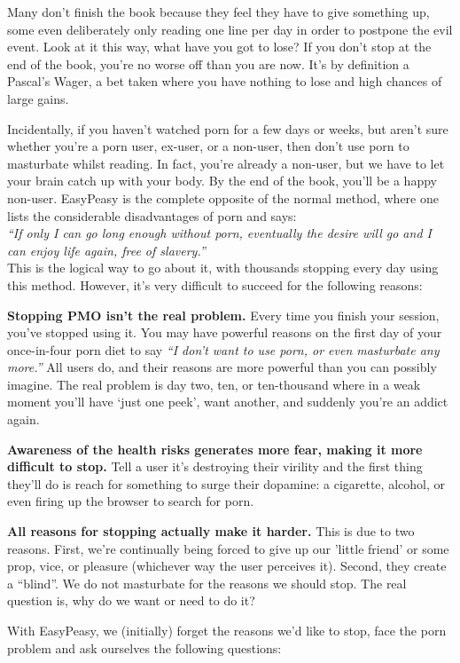 \documentclass[
]{book}
\begin{document}
Many don't finish the book because they feel they have to give something up, some even deliberately only reading one line per day in order to postpone the evil event. Look at it this way, what have you got to lose? If you don't stop at the end of the book, you're no worse off than you are now. It's by definition a Pascal's Wager, a bet taken where you have nothing to lose and high chances of large gains.

Incidentally, if you haven't watched porn for a few days or weeks, but aren't sure whether you're a porn user, ex-user, or a non-user, then don't use porn to masturbate whilst reading. In fact, you're already a non-user, but we have to let your brain catch up with your body. By the end of the book, you'll be a happy non-user. EasyPeasy is the complete opposite of the normal method, where one lists the considerable disadvantages of porn and says:\\
\emph{``If only I can go long enough without porn, eventually the desire will go and I can enjoy life again, free of slavery.''}\\
This is the logical way to go about it, with thousands stopping every day using this method. However, it's very difficult to succeed for the following reasons:

\textbf{Stopping PMO isn't the real problem.}
Every time you finish your session, you've stopped using it. You may have powerful reasons on the first day of your once-in-four porn diet to say \emph{``I don't want to use porn, or even masturbate any more.''} All users do, and their reasons are more powerful than you can possibly imagine. The real problem is day two, ten, or ten-thousand where in a weak moment you'll have `just one peek', want another, and suddenly you're an addict again.

\textbf{Awareness of the health risks generates more fear, making it more difficult to stop.}
Tell a user it's destroying their virility and the first thing they'll do is reach for something to surge their dopamine: a cigarette, alcohol, or even firing up the browser to search for porn.

\textbf{All reasons for stopping actually make it harder.}
This is due to two reasons. First, we're continually being forced to give up our 'little friend' or some prop, vice, or pleasure (whichever way the user perceives it). Second, they create a ``blind''. We do not masturbate for the reasons we should stop. The real question is, why do we want or need to do it?

With EasyPeasy, we (initially) forget the reasons we'd like to stop, face the porn problem and ask ourselves the following questions:
\end{document}
